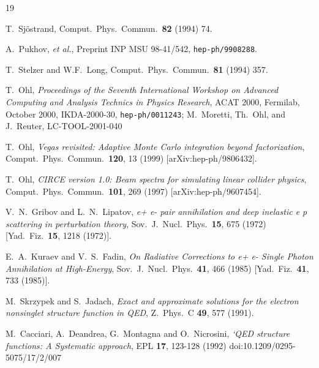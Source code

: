 \documentclass[12pt]{book}
\newcommand{\ttt}[1]{\texttt{#1}}
\begin{document}
\begin{thebibliography}{19}

  T.~Sj\"ostrand,
  Comput.\ Phys.\ Commun.\ \textbf{82} (1994) 74.

  A.~Pukhov, \emph{et al.},
  Preprint INP MSU 98-41/542, \ttt{hep-ph/9908288}.

  T.~Stelzer and W.F.~Long,
  Comput.\ Phys.\ Commun.\ \textbf{81} (1994) 357.

  T.~Ohl,
  \emph{Proceedings of the Seventh International Workshop on
  Advanced Computing and Analysis Technics in Physics Research},
  ACAT 2000, Fermilab, October 2000,
  IKDA-2000-30, \ttt{hep-ph/0011243};
  M.~Moretti, Th.~Ohl, and J.~Reuter,
  LC-TOOL-2001-040

  T.~Ohl,
  {\em Vegas revisited: Adaptive Monte Carlo integration beyond
    factorization},
  Comput.\ Phys.\ Commun.\  {\bf 120}, 13 (1999)
  [arXiv:hep-ph/9806432].

  T.~Ohl,
  {\em CIRCE version 1.0: Beam spectra for simulating linear collider
    physics},
  Comput.\ Phys.\ Commun.\  {\bf 101}, 269 (1997)
  [arXiv:hep-ph/9607454].

  V.~N.~Gribov and L.~N.~Lipatov,
  {\em e+ e- pair annihilation and deep inelastic e p scattering in
    perturbation theory},
  Sov.\ J.\ Nucl.\ Phys.\  {\bf 15}, 675 (1972)
  [Yad.\ Fiz.\  {\bf 15}, 1218 (1972)].

  E.~A.~Kuraev and V.~S.~Fadin,
  {\em On Radiative Corrections to e+ e- Single Photon Annihilation at
    High-Energy},
  Sov.\ J.\ Nucl.\ Phys.\  {\bf 41}, 466 (1985)
  [Yad.\ Fiz.\  {\bf 41}, 733 (1985)].

  M.~Skrzypek and S.~Jadach,
  {\em Exact and approximate solutions for the electron nonsinglet
    structure function in QED},
  Z.\ Phys.\ C {\bf 49}, 577 (1991).

M.~Cacciari, A.~Deandrea, G.~Montagna and O.~Nicrosini,
{\em `QED structure functions: A Systematic approach}, 
EPL \textbf{17}, 123-128 (1992)
doi:10.1209/0295-5075/17/2/007


\end{thebibliography}
\end{document}
